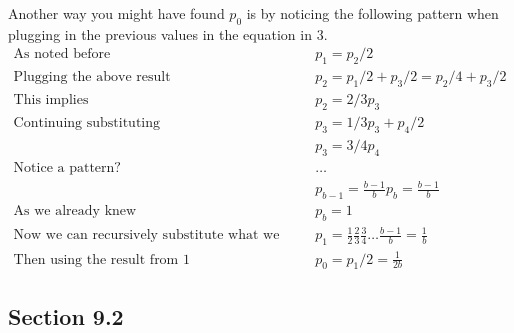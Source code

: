 \begin{exercise}
\begin{solution}

  Another way you might have found $p_0$ is by noticing the following pattern when plugging in the previous values in the equation in $3$.
\begin{align*}
\textrm{As noted before } \quad & p_1 = p_2/2 \\
\textrm{Plugging the above result } \quad & p_2 = p_1/2 + p_3/2 = p_2/4 + p_3/2 \\
  \textrm{This implies } \quad & p_2 = 2/3 p_3 \\
  \textrm{Continuing substituting } \quad & p_3 = 1/3 p_3 + p_4 / 2\\
  & p_3 = 3/4 p_4 \\
  \textrm{Notice a pattern? } \quad & \dots \\
  & p_{b-1} = \frac{b-1}{b} p_b = \frac{b-1}{b}\\
  \textrm{As we already knew} \quad & p_b = 1 \\
\textrm{Now we can recursively substitute what we know to find } \quad & p_1 = \frac{1}{2} \frac{2}{3} \frac{3}{4} \dots \frac{b-1}{b} = \frac{1}{b} \\
\textrm{Then using the result from $1$} \quad & p_0 = p_1/2 = \frac{1}{2b}
\end{align*}
\end{solution}
\end{exercise}



\subsection*{Section 9.2}
\label{sec:section-9.2}

